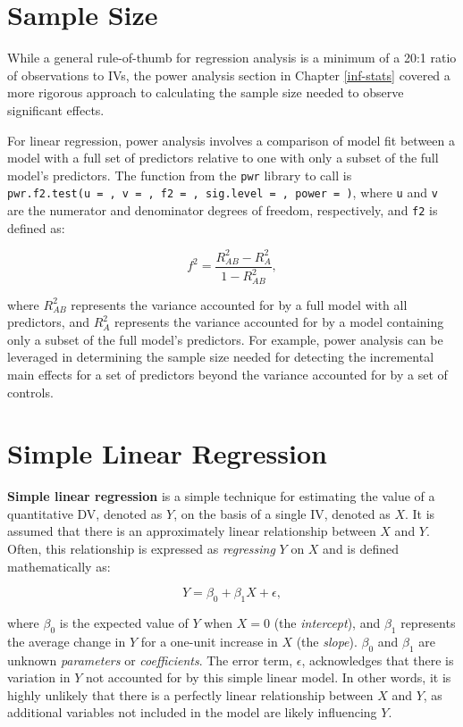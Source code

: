 \documentclass[
]{book}
\begin{document}
\hypertarget{sample-size}{%
\section{Sample Size}\label{sample-size}}

While a general rule-of-thumb for regression analysis is a minimum of a 20:1 ratio of observations to IVs, the power analysis section in Chapter \ref{inf-stats} covered a more rigorous approach to calculating the sample size needed to observe significant effects.

For linear regression, power analysis involves a comparison of model fit between a model with a full set of predictors relative to one with only a subset of the full model's predictors. The function from the \texttt{pwr} library to call is \texttt{pwr.f2.test(u\ =\ ,\ v\ =\ ,\ f2\ =\ ,\ sig.level\ =\ ,\ power\ =\ )}, where \texttt{u} and \texttt{v} are the numerator and denominator degrees of freedom, respectively, and \texttt{f2} is defined as:

\[ f^2 = \frac {R^2_{AB} - R^2_A}{1 - R^2_{AB}}, \]

where \(R^2_{AB}\) represents the variance accounted for by a full model with all predictors, and \(R^2_A\) represents the variance accounted for by a model containing only a subset of the full model's predictors. For example, power analysis can be leveraged in determining the sample size needed for detecting the incremental main effects for a set of predictors beyond the variance accounted for by a set of controls.

\hypertarget{simple-linear-regression}{%
\section{Simple Linear Regression}\label{simple-linear-regression}}

\textbf{Simple linear regression} is a simple technique for estimating the value of a quantitative DV, denoted as \(Y\), on the basis of a single IV, denoted as \(X\). It is assumed that there is an approximately linear relationship between \(X\) and \(Y\). Often, this relationship is expressed as \emph{regressing} \(Y\) on \(X\) and is defined mathematically as:

\[ Y = \beta_0 + \beta_1 X + \epsilon, \]

where \(\beta_0\) is the expected value of \(Y\) when \(X = 0\) (the \emph{intercept}), and \(\beta_1\) represents the average change in \(Y\) for a one-unit increase in \(X\) (the \emph{slope}). \(\beta_0\) and \(\beta_1\) are unknown \emph{parameters} or \emph{coefficients}. The error term, \(\epsilon\), acknowledges that there is variation in \(Y\) not accounted for by this simple linear model. In other words, it is highly unlikely that there is a perfectly linear relationship between \(X\) and \(Y\), as additional variables not included in the model are likely influencing \(Y\).
\end{document}
